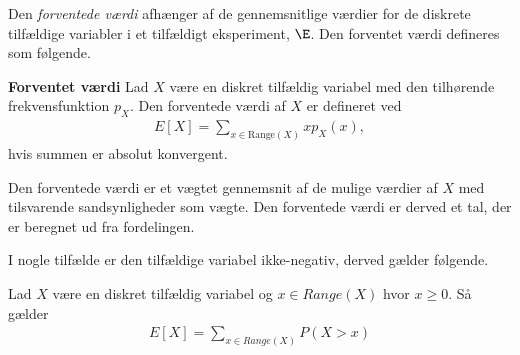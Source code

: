 



Den \textit{forventede værdi} afhænger af de gennemsnitlige værdier for de diskrete tilfældige variabler i et tilfældigt eksperiment, $\E$. Den forventet værdi defineres som følgende.




\begin{minipage}\textwidth
\begin{defn}\textbf{Forventet værdi} \label{def:Forventetværdi} %
\newline
Lad $X$ være en diskret tilfældig variabel med den tilhørende frekvensfunktion $p_X$. Den forventede værdi af $X$ er defineret ved
\begin{align}
E[X]=\sum_{x\in \text{Range}(X)} x p_X(x),
\end{align}
hvis summen er absolut konvergent.
\end{defn}
\end{minipage}

Den forventede værdi er et vægtet gennemsnit af de mulige værdier af $X$ med tilsvarende sandsynligheder som vægte. Den forventede værdi er derved et tal, der er beregnet ud fra fordelingen.

\iffalse
I nogle tilfælde er den tilfældige variabel ikke-negativ, derved gælder følgende.


\begin{minipage}\textwidth
\begin{thmx} \textbf{} \label{sæt:forventet_værdi_x_større_end_nul}%
\newline
Lad $X$ være en diskret tilfældig variabel og 
$x\in Range(X)$ hvor $x\geq0$. Så gælder
\begin{align*}
    E[X]=\sum_{x\in Range(X)} P(X > x)
\end{align*}
\end{thmx}
\end{minipage}

